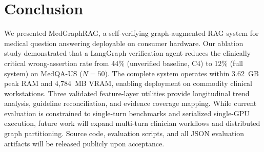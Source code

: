 \documentclass[conference]{IEEEtran}
\begin{document}
\section{Conclusion}

We presented MedGraphRAG, a self-verifying graph-augmented RAG system for
medical question answering deployable on consumer hardware. Our ablation study
demonstrated that a LangGraph verification agent reduces the clinically
critical wrong-assertion rate from 44\% (unverified baseline, C4) to 12\% (full
system) on MedQA-US ($N=50$). The
complete system operates within 3.62~GB peak RAM and 4{,}784~MB VRAM,
enabling deployment on commodity clinical workstations. Three validated
feature-layer utilities provide longitudinal trend analysis, guideline
reconciliation, and evidence coverage mapping. While current evaluation is
constrained to single-turn benchmarks and serialized single-GPU execution,
future work will expand multi-turn clinician workflows and distributed graph
partitioning. Source code, evaluation scripts, and all JSON evaluation
artifacts will be released publicly upon acceptance.



\end{document}
